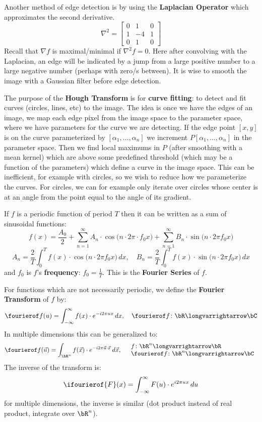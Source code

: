 \documentclass[10pt, twocolumn]{article}
\let\bold=\textbf
\def\bmat#1{\begin{bmatrix}#1\end{bmatrix}}
\begin{document}
Another method of edge detection is by using the \bold{Laplacian Operator} which approximates the second derivative.
$$ \nabla^2 = \bmat{0 & 1 & 0 \\ 1 & -4 & 1 \\ 0 & 1 & 0} $$
Recall that $\nabla f$ is maximal/minimal if $\nabla^2 f=0$.
Here after convolving with the Laplacian, an edge will be indicated by a jump from a large positive number to a large negative number (perhaps with zero/s between).
It is wise to smooth the image with a Gaussian filter before edge detection.

\vfill\break
The purpose of the \bold{Hough Transform} is for \bold{curve fitting}: to detect and fit curves (circles, lines, etc) to the image.
The idea is once we have the edges of an image, we map each edge pixel from the image space to the parameter space, where we have parameters for the curve we are detecting.
If the edge point $[x,y]$ is on the curve parameterized by $[\alpha_1,\dots,\alpha_n]$ we increment $P[\alpha_1,\dots,\alpha_n]$ in the parameter space.
Then we find local maximums in $P$ (after smoothing with a mean kernel) which are above some predefined threshold (which may be a function of the parameters) which define a curve in the image space.
This can be inefficient, for example with circles, so we wish to reduce how we parameterize the curves.
For circles, we can for example only iterate over circles whose center is at an angle from the point equal to the angle of its gradient.

\medskip
If $f$ is a periodic function of period $T$ then it can be written as a sum of sinusoidal functions:
$$ f(x) = \frac{A_0}2 + \sum_{n=1}^\infty A_n\cdot\cos\bigl(n\cdot2\pi\cdot f_0x\bigr) + \sum_{n=1}^\infty B_n\cdot\sin\bigl(n\cdot 2\pi f_0x\bigr) $$
$$ A_n = \frac2T\int_0^T f(x)\cdot\cos\bigl(n\cdot2\pi f_0x\bigr)\,dx,\quad B_n = \frac2T\int_0^T f(x)\cdot\sin\bigl(n\cdot2\pi f_0x\bigr)\,dx $$
and $f_0$ is $f$'s \bold{frequency}: $f_0=\frac1T$.
This is the \bold{Fourier Series} of $f$.

For functions which are not necessarily periodic, we define the \bold{Fourier Transform} of $f$ by:
$$ \fourierof f(u) = \int_{-\infty}^\infty f(x)\cdot e^{-i2\pi ux}\,dx, \quad \fourierof f\colon\bR\longvarrightarrow\bC $$
In multiple dimensions this can be generalized to:
$$ \fourierof f(\vec u) = \int_{\bR^n} f(\vec x)\cdot e^{-i2\pi \vec u\cdot\vec x}\, d\vec x,\quad
\begin{array}{l}f\colon\bR^n\longvarrightarrow\bR \\ \fourierof f\colon\bR^n\longvarrightarrow\bC \end{array}$$
The inverse of the transform is:
$$ \ifourierof{F}(x) = \int_{-\infty}^\infty F(u)\cdot e^{i2\pi ux}\,du $$
for multiple dimensions, the inverse is similar (dot product instead of real product, integrate over $\bR^n$).
\end{document}
